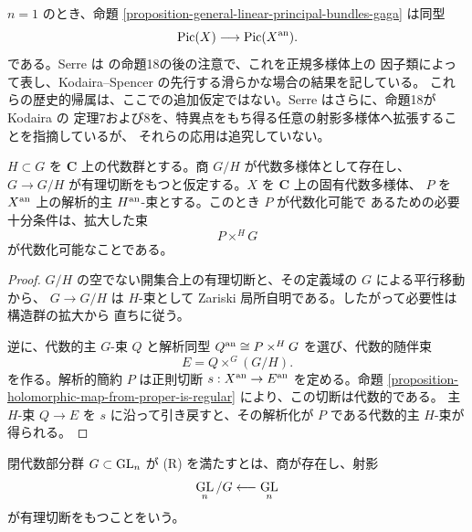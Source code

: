 \begin{remark}[直線束と歴史的定式化]
\label{remark-line-bundles-gaga}
$n=1$ のとき、命題 \ref{proposition-general-linear-principal-bundles-gaga} は同型
$$
\mathop{\rm Pic}(X)\longrightarrow\mathop{\rm Pic}(X^{\rm an}).
$$
である。Serre は \cite[\S 4、第20項]{GAGA} の命題18の後の注意で、これを正規多様体上の
因子類によって表し、Kodaira--Spencer の先行する滑らかな場合の結果を記している。
これらの歴史的帰属は、ここでの追加仮定ではない。Serre はさらに、命題18が Kodaira の
定理7および8を、特異点をもち得る任意の射影多様体へ拡張することを指摘しているが、
それらの応用は追究していない。
\end{remark}

\begin{proposition}[構造群の簡約の代数化]
\label{proposition-algebraize-reduction-structure-group}
\begin{reference}
\cite[\S 4、第20項、命題19]{GAGA}
\end{reference}
$H\subset G$ を $\mathbf C$ 上の代数群とする。商 $G/H$ が代数多様体として存在し、
$G\to G/H$ が有理切断をもつと仮定する。$X$ を $\mathbf C$ 上の固有代数多様体、
$P$ を $X^{\rm an}$ 上の解析的主 $H^{\rm an}$-束とする。このとき $P$ が代数化可能で
あるための必要十分条件は、拡大した束
$$
P\times^H G
$$
が代数化可能なことである。
\end{proposition}

\begin{proof}
$G/H$ の空でない開集合上の有理切断と、その定義域の $G$ による平行移動から、
$G\to G/H$ は $H$-束として Zariski 局所自明である。したがって必要性は構造群の拡大から
直ちに従う。

逆に、代数的主 $G$-束 $Q$ と解析同型 $Q^{\rm an}\cong P\times^H G$ を選び、代数的随伴束
$$
E=Q\times^G(G/H).
$$
を作る。解析的簡約 $P$ は正則切断 $s:X^{\rm an}\to E^{\rm an}$ を定める。命題
\ref{proposition-holomorphic-map-from-proper-is-regular} により、この切断は代数的である。
主 $H$-束 $Q\to E$ を $s$ に沿って引き戻すと、その解析化が $P$ である代数的主
$H$-束が得られる。
\end{proof}

\begin{definition}
\label{definition-rational-section-condition}
\begin{reference}
\cite[\S 4、第20項、条件 (R)]{GAGA}
\end{reference}
閉代数部分群 $G\subset\mathop{\rm GL}_n$ が \textup{(R)} を満たすとは、商が存在し、射影
$$
\mathop{\rm GL}_n/G\longleftarrow\mathop{\rm GL}_n
$$
が有理切断をもつことをいう。
\end{definition}

